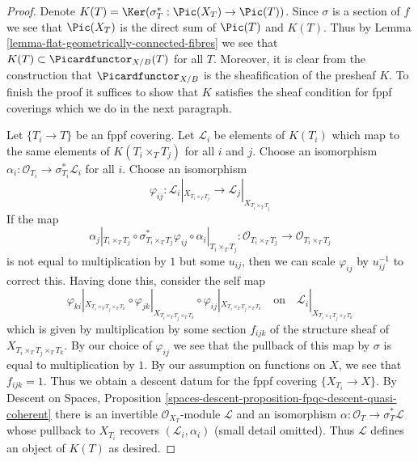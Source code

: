 \begin{proof}
Denote $K(T) = \Ker(\sigma_T^* : \Pic(X_T) \to \Pic(T))$.
Since $\sigma$ is a section of $f$ we see that $\Pic(X_T)$ is the direct
sum of $\Pic(T)$ and $K(T)$.
Thus by Lemma \ref{lemma-flat-geometrically-connected-fibres} we see that
$K(T) \subset \Picardfunctor_{X/B}(T)$ for all $T$. Moreover, it is clear
from the construction that $\Picardfunctor_{X/B}$ is the sheafification
of the presheaf $K$. To finish the proof it suffices to show that
$K$ satisfies the sheaf condition for fppf coverings which we do
in the next paragraph.

\medskip\noindent
Let $\{T_i \to T\}$ be an fppf covering. Let $\mathcal{L}_i$ be
elements of $K(T_i)$ which map to the same elements of $K(T_i \times_T T_j)$
for all $i$ and $j$. Choose an isomorphism
$\alpha_i : \mathcal{O}_{T_i} \to \sigma_{T_i}^*\mathcal{L}_i$
for all $i$. Choose an isomorphism
$$
\varphi_{ij} :
\mathcal{L}_i|_{X_{T_i \times_T T_j}}
\longrightarrow
\mathcal{L}_j|_{X_{T_i \times_T T_j}}
$$
If the map
$$
\alpha_j|_{T_i \times_T T_j} \circ
\sigma_{T_i \times_T T_j}^*\varphi_{ij} \circ
\alpha_i|_{T_i \times_T T_j} :
\mathcal{O}_{T_i \times_T T_j} \to \mathcal{O}_{T_i \times_T T_j}
$$
is not equal to multiplication by $1$ but some $u_{ij}$, then we can scale
$\varphi_{ij}$ by $u_{ij}^{-1}$ to correct this. Having done this, consider
the self map
$$
\varphi_{ki}|_{X_{T_i \times_T T_j \times_T T_k}} \circ
\varphi_{jk}|_{X_{T_i \times_T T_j \times_T T_k}} \circ
\varphi_{ij}|_{X_{T_i \times_T T_j \times_T T_k}}
\quad\text{on}\quad
\mathcal{L}_i|_{X_{T_i \times_T T_j \times_T T_k}}
$$
which is given by multiplication by some section $f_{ijk}$
of the structure sheaf of $X_{T_i \times_T T_j \times_T T_k}$.
By our choice of $\varphi_{ij}$ we see that the pullback of
this map by $\sigma$ is equal to multiplication by $1$. By
our assumption on functions on $X$, we see that $f_{ijk} = 1$.
Thus we obtain a descent datum for the fppf covering
$\{X_{T_i} \to X\}$. By
Descent on Spaces, Proposition
\ref{spaces-descent-proposition-fpqc-descent-quasi-coherent}
there is an invertible $\mathcal{O}_{X_T}$-module $\mathcal{L}$
and an isomorphism $\alpha : \mathcal{O}_T \to \sigma_T^*\mathcal{L}$
whose pullback to $X_{T_i}$ recovers $(\mathcal{L}_i, \alpha_i)$
(small detail omitted). Thus $\mathcal{L}$ defines an object
of $K(T)$ as desired.
\end{proof}

